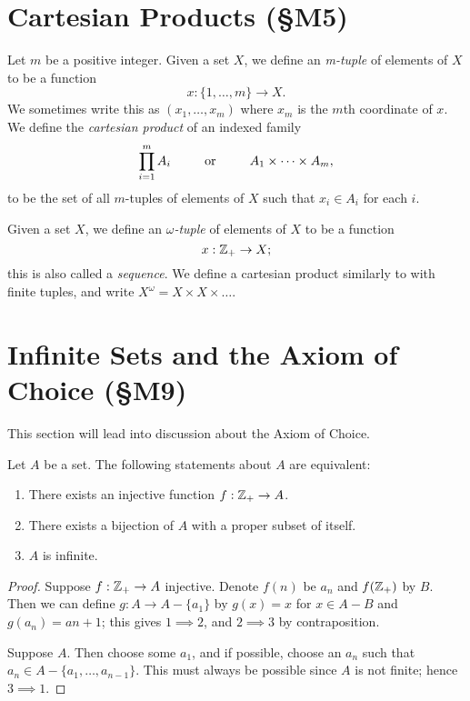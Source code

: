 \documentclass{report}
\begin{document}
\section{Cartesian Products (\S M5)}
\begin{definition}
  Let $m$ be a positive integer.
  Given a set $X$, we define an \emph{m-tuple} of elements of $X$ to be a function
  \[
    x : \{1,\dots,m\} \rightarrow X.
  \]
  We sometimes write this as $(x_1,\dots,x_m)$ where $x_m$ is the $m$th coordinate of $x$.
  We define the \emph{cartesian product} of an indexed family
  \[
    \prod_{i=1}^m A_i \text { \hspace{20pt} or \hspace{20pt} } A_1 \times \dots \times A_m,
  \]
  to be the set of all $m$-tuples of elements of $X$ such that $x_i \in A_i$ for each $i$.
\end{definition}
\begin{definition}
  Given a set $X$, we define an \emph{$\omega$-tuple} of elements of $X$ to be a function
  \[
     x : \mathbb{Z}_+ \rightarrow X;
  \]
  this is also called a \emph{sequence}.
  We define a cartesian product similarly to with finite tuples, and write $X^\omega = X \times X \times \dots$.
\end{definition}

\section{Infinite Sets and the Axiom of Choice (\S M9)}
This section will lead into discussion about the Axiom of Choice.
\begin{theorem}
 Let $A$ be a set. The following statements about $A$ are equivalent:
 
 \begin{enumerate}[label={(\arabic*)}]
    \item There exists an injective function $f:\mathbb{Z}_+ \rightarrow A$.
    \item There exists a bijection of $A$ with a proper subset of itself.
    \item $A$ is infinite.
 \end{enumerate}
\end{theorem}
\begin{proof}
  Suppose $f: \mathbb{Z}_+ \rightarrow A$ injective.
  Denote $f(n)$ be $a_n$ and $f(\mathbb{Z}_+)$ by $B$.
  Then we can define $g:A \rightarrow A - \{a_1\}$ by $g(x) = x$ for $x \in A - B$ and $g(a_n) = a{n+1}$; this gives $1 \implies 2$, and $2 \implies 3$ by contraposition.

  Suppose $A$.
  Then choose some $a_1$, and if possible, choose an $a_n$ such that $a_n \in A - \{a_1,\dots,a_{n-1}\}$.
  This must always be possible since $A$ is not finite; hence $3 \implies 1$.
\end{proof}
\end{document}
